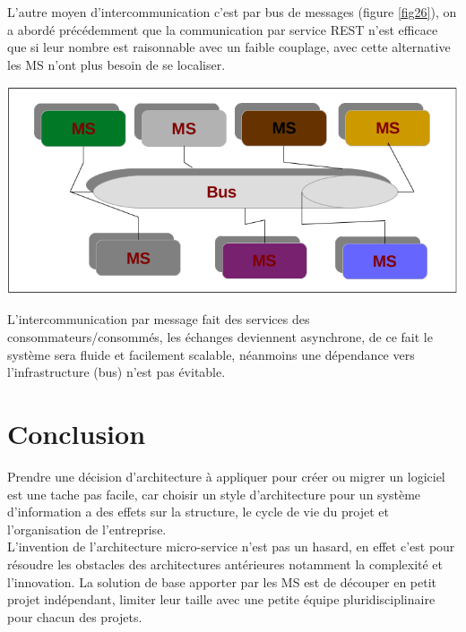 \documentclass[12pt, a4paper, openany]{report}
\begin{document}
   L'autre moyen d'intercommunication c'est par bus de messages (figure \ref{fig26}), on a abordé précédemment  que la communication par service REST n'est efficace que si leur nombre est raisonnable avec un faible couplage, avec cette alternative les MS n'ont plus besoin de se localiser.
   
    \begin{center}
      \includegraphics[scale=0.3]{intercomm_msg_26.png}
      \label{fig26}
    \end{center} 
   
    L'intercommunication par message fait des services des consommateurs/consommés, les échanges deviennent asynchrone, de ce fait le système sera fluide et facilement scalable, néanmoins une dépendance vers l'infrastructure (bus) n'est pas évitable. 
   
     

  
  
\chapter*{Conclusion}
 
 Prendre une décision d'architecture à appliquer pour créer ou migrer un logiciel est une tache pas facile, car choisir un style d'architecture pour un système d'information a des effets sur la structure, le cycle de vie du projet et l'organisation de l'entreprise.\\

  L'invention de l'architecture micro-service n'est pas un hasard, en effet c'est pour résoudre les obstacles des architectures antérieures notamment la complexité et l'innovation. La solution de base apporter par les MS est de découper en petit projet indépendant, limiter leur taille avec une petite équipe pluridisciplinaire pour chacun des projets.\\
  
\end{document}
